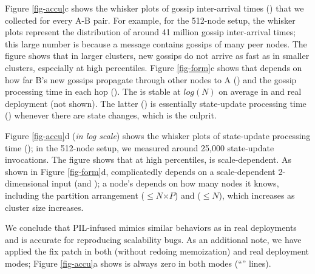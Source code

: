 


Figure \ref{fig-accu}c shows the whisker plots of gossip inter-arrival
times (\gosLast) that we collected for every A-B pair.  For example, for
the 512-node setup, the whisker plots represent the distribution of around
41 million gossip inter-arrival times; this large number is because a
message contains gossips of many peer nodes.  The figure shows that in
larger clusters, new gossips do not arrive as fast as in smaller clusters,
especially at high percentiles.
%
Figure \ref{fig-form}c shows that \gosLast depends on how far B's new
gossips propagate through other nodes to A (\hops) and the gossip
processing time in each hop (\gosProc).  The \hops is stable
at $log(N)$ on average in \sck and real deployment (not shown).  The
latter (\gosProc) is essentially state-update processing time (\supProc)
whenever there are state changes, which is the culprit.

Figure \ref{fig-accu}d ({\em in log scale}) shows the whisker plots of
state-update processing time (\supProc); in the 512-node setup, we
measured around 25,000 state-update invocations.  The figure shows that at
high percentiles, \supProc is scale-dependent.  As shown in Figure
\ref{fig-form}d, \supProc complicatedly
depends on a scale-dependent 2-dimensional input (\ringTable and
\newStates); a node's \ringTable depends on how many nodes it knows,
including the partition arrangement ($\leq$$N$$\times$$P$) and \newStates
($\leq$$N$), which increases as cluster size increases.
%
%





We conclude that PIL-infused \sck mimics similar behaviors as in real
deployments and is accurate for reproducing scalability bugs.
%
As an additional note, we have applied the fix patch in both \sck (without
redoing memoization) and real deployment modes; Figure \ref{fig-accu}a
shows \flaps is always zero in both modes (``'' lines).



